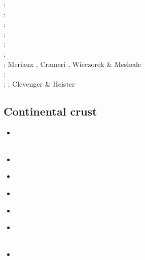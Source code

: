 \begin{scriptsize}
\twothousandtwelve: \cite{crsg12}\cite{chgv12}\cite{krwd12}\cite{may12}\cite{gerb12}\cite{asmo12}\\
\twothousandthirteen: \cite{chtl13}\cite{kemk13}\cite{gemd13}\cite{hutm13}\\
\twothousandfourteen: \cite{thmk14}\cite{mabl14}\cite{lopp14}\cite{stlh14}\\
\twothousandfifteen: \cite{lelk15}\cite{rumi15}\cite{chpe15}\cite{mabl15}\\
\twothousandsixteen: \cite{dumy16}\cite{blmp16}\\
\twothousandseventeen: \cite{robh17}\cite{wisv17}\cite{majc17}\\
\twothousandeighteen: Meriaux \etal \cite{memm18}, Crameri \cite{cram18}, Wieczorek \& Meshede \cite{wime18}\\
\twothousandnineteen: \cite{liki19}\cite{demh19}\cite{galb19}\cite{frtv19}\cite{yuwa19}\cite{ropu19}\\
\twothousandtwenty: \cite{homb20}\cite{trlb20}\cite{gadb20}\cite{jaca20a,jaca20b} 
\twothousandtwentyone: Clevenger \& Heister \cite{clhe21}
\end{scriptsize}

\subsection{Continental crust} 

\begin{scriptsize}
\begin{itemize}
\item[\nineteeneightysix] 
\textcite{chap86} \\
\textcite{bart86} \\
\item[\nineteeneightynine] 
\textcite{ord89} \\
\item[\nineteenninetyfour] 
\textcite{sawy94} \\
\item[\twothousandone] 
\textcite{dohe01} \\
\item[\twothousandfour] 
\textcite{gepm04} \\
\item[\twothousandthirteen] 
\textcite{cavg13} \\
\textcite{tibb13} \\
\item[\twothousandnineteen] 
\textcite{scmw19} 
\end{itemize}
\end{scriptsize}


